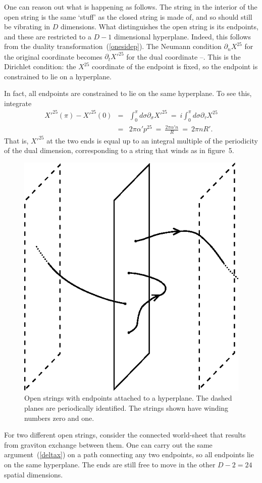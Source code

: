 \documentclass[12pt]{article}
\def\bea{\begin{eqnarray}}
\def\eea{\end{eqnarray}}
\def\ap{\alpha'}
\begin{document}
One can reason out what is happening as follows. The string in the interior
of the open string is the same `stuff' as the closed string is made of,
and so should still be vibrating in $D$ dimensions.  What distinguishes
the open string is its endpoints, and these are restricted to a $D-1$
dimensional hyperplane.  Indeed, this follows from the duality
transformation~(\ref{onesidep}).  The Neumann condition $\partial_n
X^{25}$ for the original coordinate becomes $\partial_t X'^{25}$ for the
dual coordinate \cite{dlp}--\cite{gdual}.  This is the Dirichlet
condition: the
$X^{25}$ coordinate of the endpoint is fixed, so the endpoint is constrained
to lie on a hyperplane.

In fact, all endpoints are constrained to lie on the same hyperplane.  To
see this, integrate 
\bea
X'^{25}(\pi) - X'^{25}(0) &=& \int_0^\pi d\sigma \partial_\sigma X'^{25}
\ =\ i \int_0^\pi d\sigma \partial_\tau X^{25} \nonumber\\
&=& 2\pi \ap p^{25}\ =\ \frac{2\pi \ap n}{R}\ =\ 2\pi n R'. \label{deltax}
\eea
That is, $X'^{25}$ at the two ends is equal up to an integral multiple
of the periodicity of the dual dimension, corresponding to a string that
winds as in figure~5.
\begin{figure}
\begin{center}
\leavevmode
\includegraphics{brane.eps}
\end{center}
\caption[]{Open strings with endpoints attached to a hyperplane.  The
dashed planes are periodically identified.  The strings shown have
winding numbers zero and one.}
\end{figure}
For two different open strings, consider the connected world-sheet that
results from graviton exchange between them.  One can carry out the same
argument~(\ref{deltax}) on a path connecting any two endpoints, so all
endpoints lie on the same hyperplane.  The ends are still free to move in
the other $D-2 = 24$ spatial dimensions.
\end{document}

